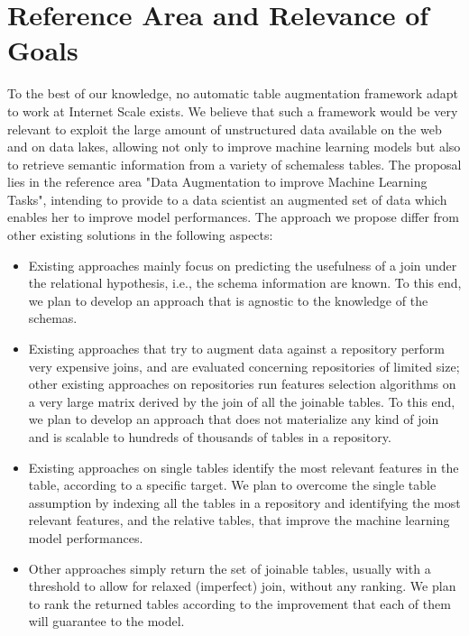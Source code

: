 \section{Reference Area and Relevance of Goals}\label{reference}
To the best of our knowledge, no automatic table augmentation framework adapt to work at Internet Scale exists. We believe that such a framework would be very relevant to exploit the large amount of unstructured data available on the web and on data lakes, allowing not only to improve machine learning models but also to retrieve semantic information from a variety of schemaless tables.
The proposal lies in the reference area "Data Augmentation to improve Machine Learning Tasks", intending to provide to a data scientist an augmented set of data which enables her to improve model performances. The approach we propose differ from other existing solutions in the following aspects:
\begin{itemize}
    \item Existing approaches mainly focus on predicting the usefulness of a join under the relational hypothesis, i.e., the schema information are known. To this end, we plan to develop an approach that is agnostic to the knowledge of the schemas.
    \item Existing approaches that try to augment data against a repository perform very expensive joins, and are evaluated concerning repositories of limited size; other existing approaches on repositories run features selection algorithms on a very large matrix derived by the join of all the joinable tables. To this end, we plan to develop an approach that does not materialize any kind of join and is scalable to hundreds of thousands of tables in a repository.
    \item Existing approaches on single tables identify the most relevant features in the table, according to a specific target. We plan to overcome the single table assumption by indexing all the tables in a repository and identifying the most relevant features, and the relative tables, that improve the machine learning model performances.
    \item Other approaches simply return the set of joinable tables, usually with a threshold to allow for relaxed  (imperfect) join, without any ranking. We plan to rank the returned tables according to the improvement that each of them will guarantee to the model.
\end{itemize}    